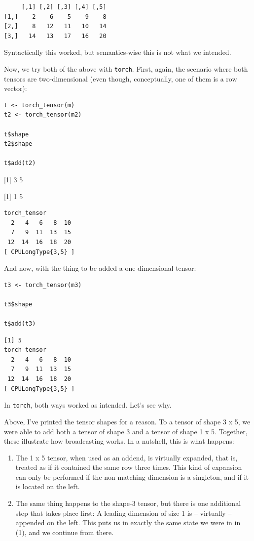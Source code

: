 \documentclass[
  letterpaper,
]{krantz}
\begin{document}
\begin{verbatim}
     [,1] [,2] [,3] [,4] [,5]
[1,]    2    6    5    9    8
[2,]    8   12   11   10   14
[3,]   14   13   17   16   20
\end{verbatim}

Syntactically this worked, but semantics-wise this is not what we
intended.

Now, we try both of the above with \texttt{torch}. First, again, the
scenario where both tensors are two-dimensional (even though,
conceptually, one of them is a row vector):

\begin{verbatim}
t <- torch_tensor(m)
t2 <- torch_tensor(m2)

t$shape
t2$shape

t$add(t2)
\end{verbatim}

{[}1{]} 3 5

{[}1{]} 1 5

\begin{verbatim}
torch_tensor
  2   4   6   8  10
  7   9  11  13  15
 12  14  16  18  20
[ CPULongType{3,5} ]
\end{verbatim}

And now, with the thing to be added a one-dimensional tensor:

\begin{verbatim}
t3 <- torch_tensor(m3)

t3$shape

t$add(t3)
\end{verbatim}

\begin{verbatim}
[1] 5
torch_tensor
  2   4   6   8  10
  7   9  11  13  15
 12  14  16  18  20
[ CPULongType{3,5} ]
\end{verbatim}

In \texttt{torch}, both ways worked as intended. Let's see why.

Above, I've printed the tensor shapes for a reason. To a tensor of shape
3 x 5, we were able to add both a tensor of shape 3 and a tensor of
shape 1 x 5. Together, these illustrate how broadcasting works. In a
nutshell, this is what happens:

\begin{enumerate}
\def\labelenumi{\arabic{enumi}.}
\item
  The 1 x 5 tensor, when used as an addend, is virtually expanded, that
  is, treated as if it contained the same row three times. This kind of
  expansion can only be performed if the non-matching dimension is a
  singleton, and if it is located on the left.
\item
  The same thing happens to the shape-3 tensor, but there is one
  additional step that takes place first: A leading dimension of size 1
  is -- virtually -- appended on the left. This puts us in exactly the
  same state we were in in (1), and we continue from there.
\end{enumerate}
\end{document}
